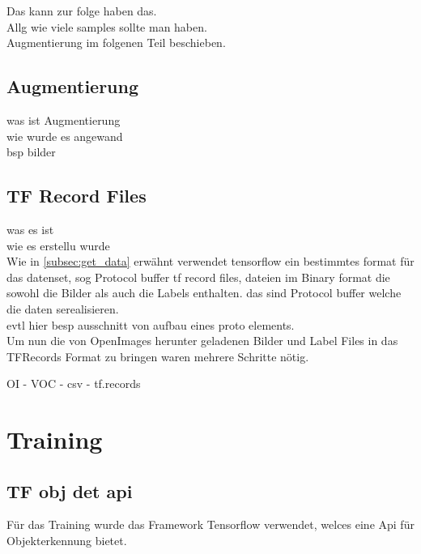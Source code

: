 Das kann zur folge haben das.\\

Allg wie viele samples sollte man haben.\\

Augmentierung im folgenen Teil beschieben.



\subsection{Augmentierung}




was ist Augmentierung\\
wie wurde es angewand\\
bsp bilder



\subsection{TF Record Files}\label{subsec:tfrecord}

was es ist\\
wie es erstellu wurde\\

Wie in \ref{subsec:get_data} erwähnt verwendet tensorflow ein bestimmtes format für das datenset, sog 
Protocol buffer tf record files, dateien im Binary format die sowohl die Bilder als 
auch die Labels enthalten. das sind Protocol buffer welche die daten serealisieren.\\
evtl hier besp ausschnitt von aufbau eines proto elements.\\

Um nun die von OpenImages herunter geladenen Bilder und Label Files in das TFRecords Format zu bringen waren 
mehrere Schritte nötig.

OI - VOC - csv - tf.records



\section{Training}

\subsection{TF obj det api}

Für das Training wurde das Framework Tensorflow verwendet, welces eine Api für Objekterkennung bietet. 

